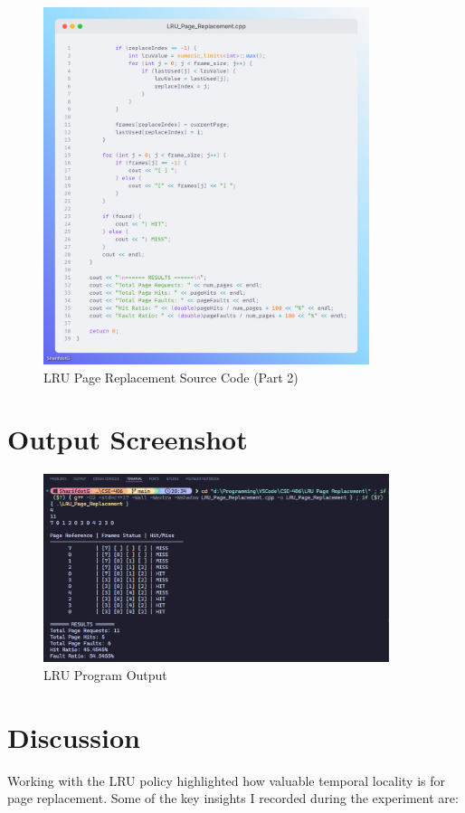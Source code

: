 \documentclass[12pt,a4paper]{article}
\begin{document}
\begin{figure}
    \centering
    \includegraphics[width=0.85\textwidth]{Code2.png}
	\caption{LRU Page Replacement Source Code (Part 2)}
\end{figure}

\section{Output Screenshot}
\begin{figure}[H]
	\centering
	\includegraphics[width=0.9\textwidth]{Screenshot 2025-10-09 203619.png}
	\caption{LRU Program Output}
\end{figure}

\section{Discussion}
Working with the LRU policy highlighted how valuable temporal locality is for page replacement. Some of the key insights I recorded during the experiment are:
\end{document}
